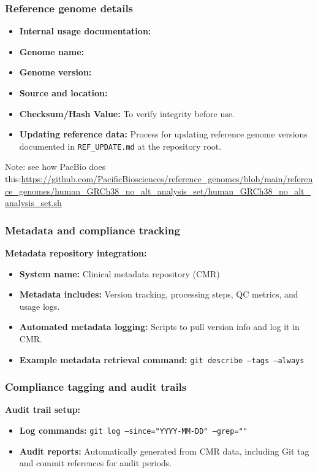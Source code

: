 \subsubsection{Reference genome details}
\begin{itemize}
    \item \textbf{Internal usage documentation:} \\
    \item \textbf{Genome name:}  \\
    \item \textbf{Genome version:} \\
    \item \textbf{Source and location:} \\
    \item \textbf{Checksum/Hash Value:} To verify integrity before use.
    \item \textbf{Updating reference data:} Process for updating reference genome versions documented in \texttt{REF\_UPDATE.md} at the repository root.
\end{itemize}

Note: see how PacBio does this:\url{https://github.com/PacificBiosciences/reference_genomes/blob/main/reference_genomes/human_GRCh38_no_alt_analysis_set/human_GRCh38_no_alt_analysis_set.sh}

\subsubsection{Metadata and compliance tracking}
\textbf{Metadata repository integration:}
\begin{itemize}
    \item \textbf{System name:} Clinical metadata repository (CMR)
    \item \textbf{Metadata includes:} Version tracking, processing steps, QC metrics, and usage logs.
    \item \textbf{Automated metadata logging:} Scripts to pull version info and log it in CMR.
    \item \textbf{Example metadata retrieval command:} \texttt{git describe --tags --always}
\end{itemize}

\subsubsection{Compliance tagging and audit trails}
\textbf{Audit trail setup:}
\begin{itemize}
    \item \textbf{Log commands:} \texttt{git log --since="YYYY-MM-DD" --grep="\ivdrCompliantTag"}
    \item \textbf{Audit reports:} Automatically generated from CMR data, including Git tag and commit references for audit periods.
\end{itemize}

